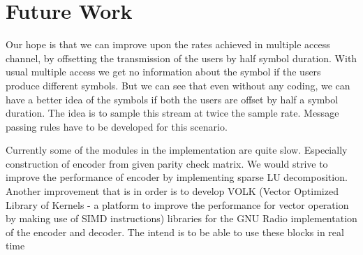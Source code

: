 \section{Future Work}
Our hope is that we can improve upon the rates achieved in multiple access channel, by offsetting the transmission of the users by half symbol duration.
With usual multiple access we get no information about the symbol if the users produce different symbols. But we can see that even without any coding, we can
have a better idea of the symbols if both the users are offset by half a symbol duration. The idea is to sample this stream at twice the sample rate.
Message passing rules have to be developed for this scenario.

Currently some of the modules in the implementation are quite slow. Especially construction of encoder from given parity check matrix. We would strive to
improve the performance of encoder by implementing sparse LU decomposition. Another improvement that is in order is to develop VOLK (Vector Optimized Library of Kernels - 
a platform to improve the performance for vector operation by making use of SIMD instructions) libraries for the GNU Radio implementation of the encoder and decoder.
The intend is to be able to use these blocks in real time